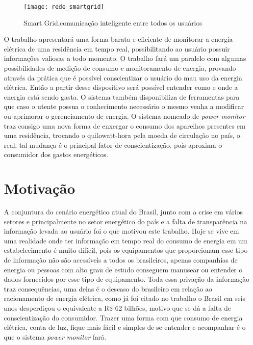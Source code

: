 \begin{figure}[h!]
	\texttt{[image: rede\_smartgrid]}
	\centering
	\caption[Smart Grid,comunicação inteligente entre todos os usuários]{Smart Grid,comunicação inteligente entre todos os usuários}
	\label{fig:rede_smartgrid}
\end{figure}
\FloatBarrier

O trabalho apresentará uma forma barata e eficiente de monitorar a energia elétrica de uma residência em tempo real, possibilitando ao usuário
possuir informações valiosas a todo momento. O trabalho fará um paralelo com algumas possibilidades de medição de consumo e monitoramento
de energia, provando através da prática que é possível conscientizar o usuário do mau uso da energia elétrica.
Então a partir desse dispositivo será possível entender como e onde a energia está sendo gasta. O sistema também disponibiliza de ferramentas para que 
caso o utente possua o conhecimento necessário o mesmo venha a modificar ou aprimorar o gerenciamento de energia. O sistema nomeado de \textit{power monitor}
traz consigo uma nova forma de enxergar o consumo dos aparelhos presentes em uma residência, trocando o quilowatt-hora pela moeda de circulação no país,
o real, tal mudança é o principal fator de conscientização, pois aproxima o consumidor dos gastos energéticos.


\section{Motivação}
A conjuntura do cenário energético atual do Brasil, junto com a crise em vários setores e principalmente no setor
energético do país e a falta de transparência na informação levada ao usuário foi o que motivou este trabalho. Hoje se vive em uma realidade onde
ter informação em tempo real do consumo de energia em um estabelecimento é muito difícil, pois os equipamentos que proporcionam esse tipo de informação
não são acessíveis a todos os brasileiros, apenas companhias de energia ou pessoas com alto grau de estudo conseguem manusear ou entender o dados
fornecidos por esse tipo de equipamento. Toda essa privação da informação traz consequências, uma delas é o descaso do brasileiro em relação ao
racionamento de energia elétrica, como já foi citado no trabalho o Brasil em seis anos desperdiçou o equivalente a R\$ 62 bilhões, motivo que se 
dá a falta de conscientização do consumidor. Trazer uma forma com que consumo de energia elétrica, conta de luz, fique mais fácil e simples de se entender
e acompanhar é o que o sistema \textit{power monitor} fará.   

